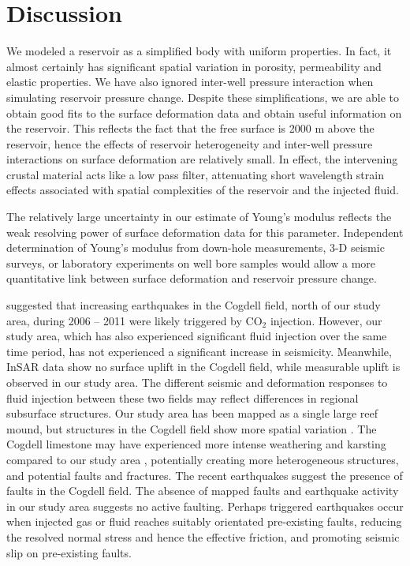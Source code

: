 \section{Discussion}
We modeled a reservoir as a simplified body with uniform properties.  In fact, it almost certainly has significant spatial variation in porosity, permeability and elastic properties.  We have also ignored inter-well pressure interaction when simulating reservoir pressure change.  Despite these simplifications, we are able to obtain good fits to the surface deformation data and obtain useful information on the reservoir.  This reflects the fact that the free surface is 2000 m above the reservoir, hence the effects of reservoir heterogeneity and inter-well pressure interactions on surface deformation are relatively small.  In effect, the intervening crustal material acts like a low pass filter, attenuating short wavelength strain effects associated with spatial complexities of the reservoir and the injected fluid.  

The relatively large uncertainty in our estimate of Young’s modulus reflects the weak resolving power of surface deformation data for this parameter.  Independent determination of Young’s modulus from down-hole measurements, 3-D seismic surveys, or laboratory experiments on well bore samples would allow a more quantitative link between surface deformation and reservoir pressure change.

\citet{gan2013gas} suggested that increasing earthquakes in the Cogdell field, north of our study area, during 2006 – 2011 were likely triggered by CO$_{2}$ injection.  However, our study area, which has also experienced significant fluid injection over the same time period, has not experienced a significant increase in seismicity.  Meanwhile, InSAR data show no surface uplift in the Cogdell field, while measurable uplift is observed in our study area.  The different seismic and deformation responses to fluid injection between these two fields may reflect differences in regional subsurface structures.  Our study area has been mapped as a single large reef mound, but structures in the Cogdell field show more spatial variation \cite[]{vest1970oil}. The Cogdell limestone may have experienced more intense weathering and karsting compared to our study area \cite[]{reid1991cogdell}, potentially creating more heterogeneous structures, and potential faults and fractures.  The recent earthquakes suggest the presence of faults in the Cogdell field.   The absence of mapped faults and earthquake activity in our study area suggests no active faulting.  Perhaps triggered earthquakes occur when injected gas or fluid reaches suitably orientated pre-existing faults, reducing the resolved normal stress and hence the effective friction, and promoting seismic slip on pre-existing faults.  


